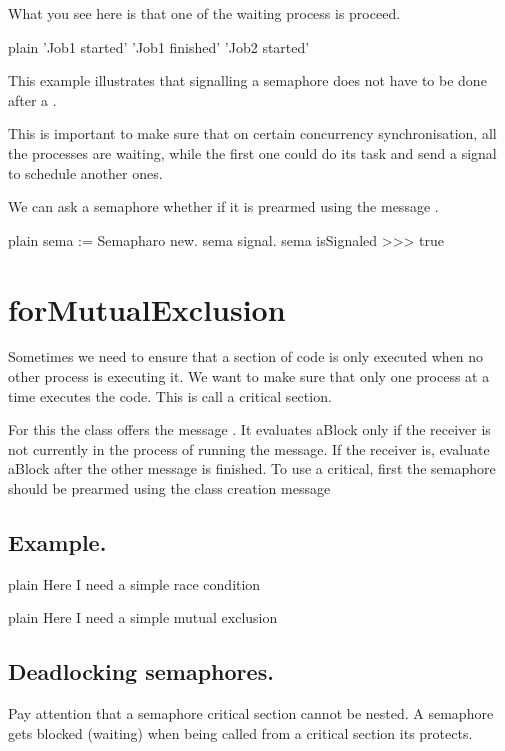 \documentclass[10pt,twoside,english]{_support/latex/sbabook/sbabook}
\begin{document}
What you see here is that one of the waiting process is proceed.

\begin{displaycode}{plain}
'Job1 started'
'Job1 finished'
'Job2 started'
\end{displaycode}

This example illustrates that signalling a semaphore does not have to be done after a .

This is important to make sure that on certain concurrency synchronisation, all the processes are waiting, while the first one could do its task and send a signal to schedule another ones. 

We can ask a semaphore whether if it is prearmed using the message . 

\begin{displaycode}{plain}
sema := Semapharo new.
sema signal.
sema isSignaled
>>> true
\end{displaycode}
\section{forMutualExclusion}
Sometimes we need to ensure that a section of code is only executed when no other process is executing it. 
We want to make sure that only one process at a time executes the code. 
This is call a critical section. 

For this the class  offers the message .
It evaluates aBlock only if the receiver is not currently in the process of running the  message. 
If the receiver is, evaluate aBlock after the other  message is finished.
To use a critical, first the semaphore should be prearmed using the class creation message 
\subsection{Example.}
\begin{displaycode}{plain}
	Here I need a simple race condition 
\end{displaycode}

 

\begin{displaycode}{plain}
	Here I need a simple mutual exclusion
\end{displaycode}

 
\subsection{Deadlocking semaphores.}
Pay attention that a semaphore critical section cannot be nested. A semaphore gets blocked (waiting) when being called from a critical section its protects. 
\end{document}
